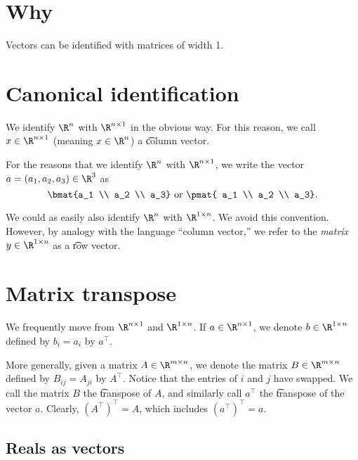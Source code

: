 

\section*{Why}

Vectors can be identified with matrices of width 1.

\section*{Canonical identification}

We identify $\R ^{n}$ with $\R ^{n \times  1}$ in the obvious way.
For this reason, we call $x \in \R ^{n \times  1}$ (meaning $x \in \R ^{n}$) a \t{column vector}.

For the reasons that we identify $\R ^n$ with $\R ^{n \times 1}$, we write the vector $a = (a_1, a_2, a_3) \in \R ^3$ as
\[
\bmat{a_1 \\ a_2 \\ a_3}
\text{ or }
\pmat{ a_1 \\ a_2 \\ a_3}.
\]

We could as easily also identify $\R ^{n}$ with $\R ^{1 \times n}$.
We avoid this convention.
However, by analogy with the language ``column vector,'' we refer to the \textit{matrix} $y \in \R ^{1 \times  n}$ as a \t{row vector}.

\section*{Matrix transpose}

We frequently move from $\R ^{n \times  1}$ and $\R ^{1 \times n}$.
If $a \in \R ^{n \times  1}$, we denote $b \in \R ^{1 \times n}$ defined by $b_i = a_i$ by $a^\top $.

More generally, given a matrix $A \in \R ^{m \times  n}$, we denote the matrix $B \in \R ^{m \times  n}$ defined by $B_{ij} = A_{ji}$ by $A^\top $.
Notice that the entries of $i$ and $j$ have swapped.
We call the matrix $B$ the \t{transpose} of $A$, and similarly call $a^\top $ the \t{transpose} of the vector $a$.
Clearly, $(A^\top )^\top  = A$, which includes $(a^\top )^\top  = a$.

\subsection*{Reals as vectors}

